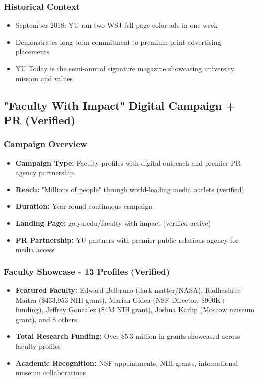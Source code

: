 \documentclass[12pt,letterpaper]{article}
\begin{document}
\subsubsection{Historical Context}
\begin{itemize}[leftmargin=*]
    \item September 2018: YU ran two WSJ full-page color ads in one week
    \item Demonstrates long-term commitment to premium print advertising placements
    \item YU Today is the semi-annual signature magazine showcasing university mission and values
\end{itemize}

\subsection{"Faculty With Impact" Digital Campaign + PR (Verified)}

\subsubsection{Campaign Overview}
\begin{itemize}[leftmargin=*]
    \item \textbf{Campaign Type:} Faculty profiles with digital outreach and premier PR agency partnership
    \item \textbf{Reach:} "Millions of people" through world-leading media outlets (verified)
    \item \textbf{Duration:} Year-round continuous campaign
    \item \textbf{Landing Page:} go.yu.edu/faculty-with-impact (verified active)
    \item \textbf{PR Partnership:} YU partners with premier public relations agency for media access
\end{itemize}

\subsubsection{Faculty Showcase - 13 Profiles (Verified)}
\begin{itemize}[leftmargin=*]
    \item \textbf{Featured Faculty:} Edward Belbruno (dark matter/NASA), Radhashree Maitra (\$433,953 NIH grant), Marian Gidea (NSF Director, \$900K+ funding), Jeffrey Gonzalez (\$4M NIH grant), Joshua Karlip (Moscow museum grant), and 8 others
    \item \textbf{Total Research Funding:} Over \$5.3 million in grants showcased across faculty profiles
    \item \textbf{Academic Recognition:} NSF appointments, NIH grants, international museum collaborations
\end{itemize}
\end{document}
